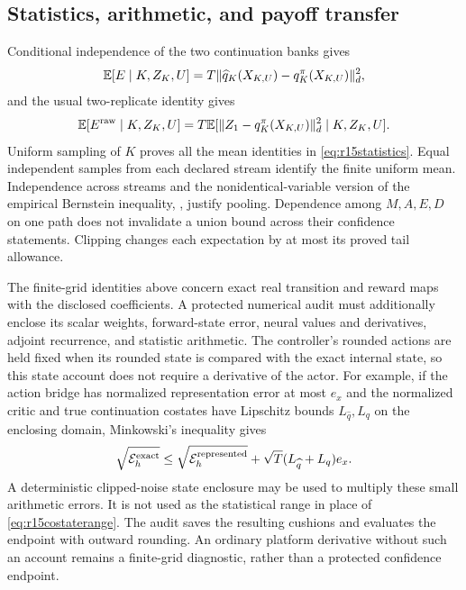 \subsection{Statistics, arithmetic, and payoff transfer}
Conditional independence of the two continuation banks gives
\[
 \mathbb E[E\mid K,Z_K,U]
       =T\|\widehat q_K(X_{K,U})-q_K^\pi(X_{K,U})\|_d^2,
\]
and the usual two-replicate identity gives
\[
\mathbb E[E^{\rm raw}\mid K,Z_K,U]=
T\mathbb E[\|Z_1-q_K^\pi(X_{K,U})\|_d^2\mid K,Z_K,U].
\]
Uniform sampling of $K$ proves all the mean identities in
\eqref{eq:r15statistics}. Equal independent samples from each
declared stream identify the finite uniform mean. Independence across
streams and the nonidentical-variable version of the empirical
Bernstein inequality, \citet[Theorem~11]{maurer2009}, justify pooling.
Dependence among $M,A,E,D$ on one path does not invalidate a union
bound across their confidence statements. Clipping changes each
expectation by at most its proved tail allowance.

The finite-grid identities above concern exact real transition and
reward maps with the disclosed coefficients. A protected numerical
audit must additionally enclose its scalar weights, forward-state
error, neural values and derivatives, adjoint recurrence, and statistic
arithmetic. The controller's rounded actions are held fixed when its
rounded state is compared with the exact internal state, so this state
account does not require a derivative of the actor. For example, if
the action bridge has normalized representation error at most $e_x$
and the normalized critic and true continuation costates have
Lipschitz bounds $L_{\widehat q},L_q$ on the enclosing domain,
Minkowski's inequality gives
\[
 \sqrt{\mathcal E_h^{\rm exact}}
 \leq\sqrt{\mathcal E_h^{\rm represented}}
              +\sqrt T(L_{\widehat q}+L_q)e_x.
\]
A deterministic clipped-noise state enclosure may be used to multiply
these small arithmetic errors. It is not used as the statistical
range in place of \eqref{eq:r15costaterange}. The audit saves the
resulting cushions and evaluates the endpoint with outward rounding.
An ordinary platform derivative without such an account remains a
finite-grid diagnostic, rather than a protected confidence endpoint.

